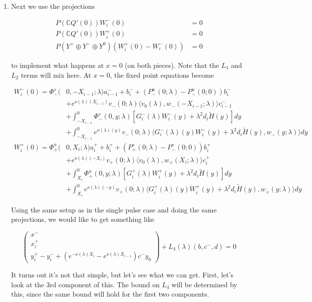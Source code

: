 \documentclass[12pt]{article}
\def\C{{\mathbb C}}
\begin{document}
\begin{enumerate}
\item Next we use the projections 

\begin{align*}
P(\C Q'(0))W_i^-(0) &= 0 \\
P(\C Q'(0))W_i^+(0) &= 0 \\
P(Y^+ \oplus Y^- \oplus Y^0) ( W_i^+(0) - W_i^-(0) ) &= 0
\end{align*}

to implement what happens at $x = 0$ (on both pieces). Note that the $L_1$ and $L_2$ terms will mix here. At $x = 0$, the fixed point equations become

\begin{align*}
W_i^-(0) = \Phi^s_-(&0, -X_{i-1}; \lambda)a_{i-1}^- + b_i^- + (P^u_-(0; \lambda) - P^u_-(0; 0))b_i^- \\
&+ e^{\nu(\lambda)(X_{i-1})} v_-(0; \lambda) \langle v_0(\lambda), w_-(-X_{i-1}; \lambda) \rangle c_{i-1}^- \\
&+ \int_{-X_{i-1}}^0 \Phi^s_-(0, y; \lambda) [ G_i^-(\lambda)W_i^-(y) + \lambda^2 d_i \tilde{H}(y) ] dy \\
&+ \int_{-X_{i-1}}^0
e^{\nu(\lambda)(y)} v_-(0; \lambda) \langle G_i^-(\lambda)(y)W_i^-(y) + \lambda^2 d_i \tilde{H}(y), w_-(y; \lambda) \rangle dy \\
W_i^+(0) = \Phi^u_+(&0, X_i; \lambda)a_i^+ + b_i^+ + (P^s_+(0; \lambda) - P^s_-(0; 0))b_i^+ \\
&+ e^{\nu(\lambda)(-X_i)} v_+(0; \lambda) \langle v_0(\lambda), w_+(X_i; \lambda) \rangle c_i^+ \\
&+ \int_{X_i}^0 \Phi^u_+(0, y; \lambda) [ G_i^+(\lambda)W_i^+(y) + \lambda^2 d_i \tilde{H}(y) ] dy \\
&+ \int_{X_i}^0 e^{\nu(\lambda)(-y)} v_+(0; \lambda) \langle G_i^+(\lambda)(y)W_i^+(y) + \lambda^2 d_i \tilde{H}(y), w_+(y; \lambda) \rangle dy
\end{align*}

Using the same setup as in the single pulse case and doing the same projections, we would like to get something like

\[
\begin{pmatrix}x^- \\ x_i^+ \\ y_i^+ - y_i^- + (e^{-\nu(\lambda)X_i} - e^{\nu(\lambda)X_{i-1}}) c^- y_0 \end{pmatrix} + L_4(\lambda)(b, c^-,d) = 0
\]

It turns out it's not that simple, but let's see what we can get. First, let's look at the 3rd component of this. The bound on $L_4$ will be determined by this, since the same bound will hold for the first two components.


\end{enumerate}
\end{document}
